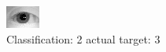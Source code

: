 \begin{figure}[h!]
\begin{center}
\includegraphics[width=0.60\columnwidth]{figures/ID1087_class_2_target_3.png}
\end{center}
\caption{ Classification: 2 actual target: 3}
\label{fig:ID1087_class_2_target_3}
\end{figure}
